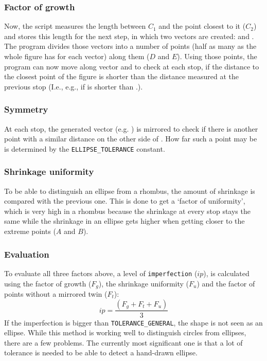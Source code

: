 \documentclass[12pt, a4paper]{article}
\begin{document}
            \subsubsection*{Factor of growth}
                Now, the script measures the length between $C_1$ and the point closest to it ($C_2$) and stores this length for the next step, in which two vectors are created:  and . The program divides those vectors into a number of points (half as many as the whole figure has for each vector) along them ($D$ and $E$). Using those points, the program can now move along vector  and  to check at each stop, if the distance to the closest point of the figure is shorter than the distance measured at the previous stop (I.e., e.g., if  is shorter than .).

            \subsubsection*{Symmetry}
                At each stop, the generated vector (e.g. ) is mirrored to check if there is another point with a similar distance on the other side of . How far such a point may be is determined by the \texttt{ELLIPSE\_TOLERANCE} constant.

            \subsubsection*{Shrinkage uniformity}
                To be able to distinguish an ellipse from a rhombus, the amount of shrinkage is compared with the previous one. This is done to get a `factor of uniformity', which is very high in a rhombus because the shrinkage at every stop stays the same while the shrinkage in an ellipse gets higher when getting closer to the extreme points ($A$ and $B$).

            \subsubsection*{Evaluation}
                To evaluate all three factors above, a level of \texttt{imperfection} ($ip$), is calculated using the factor of growth ($F_g$), the shrinkage uniformity ($F_u$) and the factor of points without a mirrored twin ($F_t$): $$ip=\frac{(F_g + F_t + F_u)}{3}$$ If the imperfection is bigger than \texttt{TOLERANCE\_GENERAL}, the shape is not seen as an ellipse. While this method is working well to distinguish circles from ellipses, there are a few problems. The currently most significant one is that a lot of tolerance is needed to be able to detect a hand-drawn ellipse.
\end{document}
